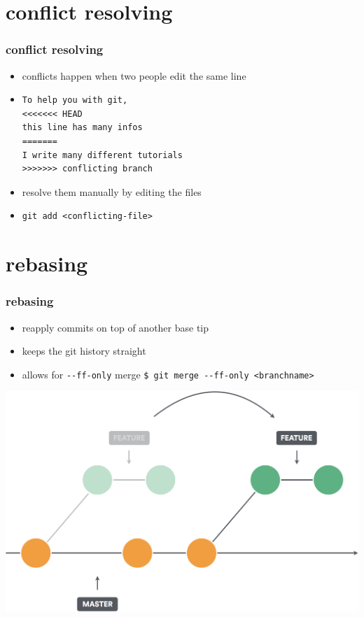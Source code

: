 \documentclass{beamer}
\begin{document}
	\section{conflict resolving}
	\begin{frame}[fragile]
		\frametitle{conflict resolving}\pause
		\begin{itemize}
			\item conflicts happen when two people edit the same line\pause
			\item[] 
			\begin{lstlisting}
To help you with git,
<<<<<<< HEAD
this line has many infos
=======
I write many different tutorials
>>>>>>> conflicting branch
			\end{lstlisting}
			\item resolve them manually by editing the files\pause\newline
			\item \lstinline|git add <conflicting-file>|
		\end{itemize}
	\end{frame}
	
	\section{rebasing}
	\begin{frame}
		\frametitle{rebasing}\pause
		\begin{itemize}
			\item reapply commits on top of another base tip\pause
			\item keeps the git history straight\pause
			\item allows for \lstinline|--ff-only| merge\newline
			\lstinline|$ git merge --ff-only <branchname>| \pause
		\end{itemize}
		\includegraphics[width=.725\linewidth]{images/gitrebase.png}
	\end{frame}
	
\end{document}
